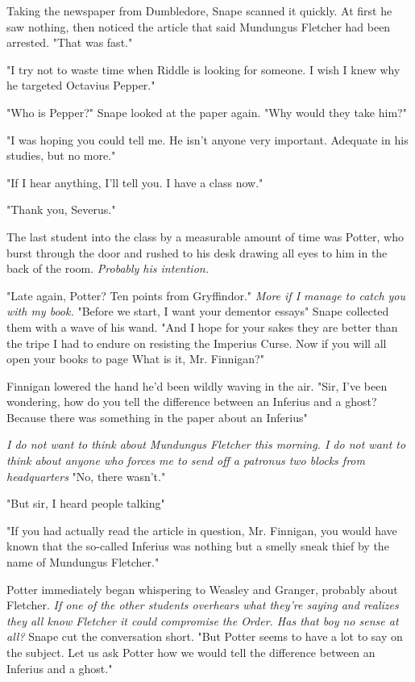 Taking the newspaper from Dumbledore, Snape scanned it quickly. At first he saw nothing, then noticed the article that said Mundungus Fletcher had been arrested. "That was fast."

"I try not to waste time when Riddle is looking for someone. I wish I knew why he targeted Octavius Pepper."

"Who is Pepper?" Snape looked at the paper again. "Why would they take him?"

"I was hoping you could tell me. He isn't anyone very important. Adequate in his studies, but no more."

"If I hear anything, I'll tell you. I have a class now."

"Thank you, Severus."

The last student into the class by a measurable amount of time was Potter, who burst through the door and rushed to his desk drawing all eyes to him in the back of the room. \emph{Probably his intention.}

"Late again, Potter? Ten points from Gryffindor." \emph{More if I manage to catch you with my book.} "Before we start, I want your dementor essays{\el}" Snape collected them with a wave of his wand. "And I hope for your sakes they are better than the tripe I had to endure on resisting the Imperius Curse. Now if you will all open your books to page{\el} What is it, Mr. Finnigan?"

Finnigan lowered the hand he'd been wildly waving in the air. "Sir, I've been wondering, how do you tell the difference between an Inferius and a ghost? Because there was something in the paper about an Inferius{\el}"

\emph{I do not want to think about Mundungus Fletcher this morning. I do not want to think about anyone who forces me to send off a patronus two blocks from headquarters{\el}} "No, there wasn't."

"But sir, I heard people talking{\el}"

"If you had actually read the article in question, Mr. Finnigan, you would have known that the so-called Inferius was nothing but a smelly sneak thief by the name of Mundungus Fletcher."

Potter immediately began whispering to Weasley and Granger, probably about Fletcher. \emph{If one of the other students overhears what they're saying and realizes they all know Fletcher it could compromise the Order. Has that boy no sense at all?} Snape cut the conversation short. "But Potter seems to have a lot to say on the subject. Let us ask Potter how we would tell the difference between an Inferius and a ghost."

